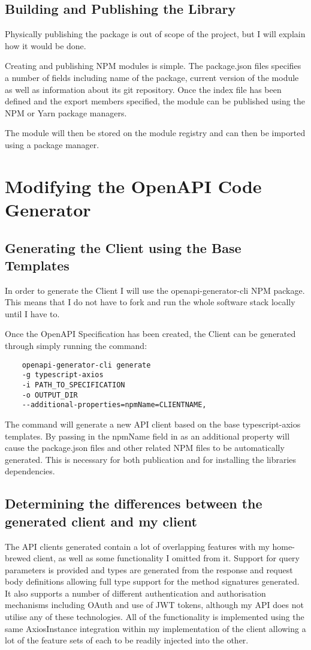 \subsection{Building and Publishing the Library}
    Physically publishing the package is out of scope of the project, but I will explain how it would be done.

    Creating and publishing NPM modules is simple. The package.json files specifies a number of fields including name of the package, current version of the module as well as information about its git repository. Once the index file has been defined and the export members specified, the module can be published using the NPM or Yarn package managers.
    
    The module will then be stored on the module registry and can then be imported using a package manager. 
    
\section{Modifying the OpenAPI Code Generator}
\subsection{Generating the Client using the Base Templates}
In order to generate the Client I will use the openapi-generator-cli NPM package. This means that I do not have to fork and run the whole software stack locally until I have to.

Once the OpenAPI Specification has been created, the Client can be generated through simply running the command:
\begin{verbatim}
    openapi-generator-cli generate 
    -g typescript-axios 
    -i PATH_TO_SPECIFICATION
    -o OUTPUT_DIR
    --additional-properties=npmName=CLIENTNAME,
\end{verbatim}
The command will generate a new API client based on the base typescript-axios templates. By passing in the npmName field in as an additional property will cause the package.json files and other related NPM files to be automatically generated. This is necessary for both publication and for installing the libraries dependencies.
\subsection{Determining the differences between the generated client and my client}
The API clients generated contain a lot of overlapping features with my home-brewed client, as well as some functionality I omitted from it. Support for query parameters is provided and types are generated from the response and request body definitions allowing full type support for the method signatures generated. It also supports a number of different authentication and authorisation mechanisms including OAuth and use of JWT tokens, although my API does not utilise any of these technologies. All of the functionality is implemented using the same AxiosInstance integration within my implementation of the client allowing a lot of the feature sets of each to be readily injected into the other. 

